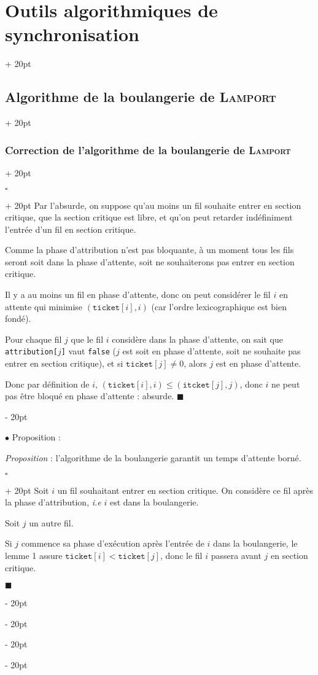\documentclass[a4paper, 12pt, twoside]{article}
\renewcommand{\le}{\leqslant}
\newcommand{\ind}[1][20pt]{\advance\leftskip + #1}
\newcommand{\deind}[1][20pt]{\advance\leftskip - #1}
\newenvironment{indt}[2][20pt]{#2 \par \ind[#1]}{\par \deind} %
\newenvironment{proof}[1][{}]{\begin{indt}{$\square$ #1}}{$\blacksquare$ \end{indt}}
\begin{document}
\begin{indt}{\section{Outils algorithmiques de synchronisation}}
\begin{indt}{\subsection{Algorithme de la boulangerie de \textsc{Lamport}}}
\begin{indt}{\subsubsection{Correction de l'algorithme de la boulangerie de \textsc{Lamport}}}
                \vspace{12pt}
                
                \begin{proof}
                    Par l'absurde, on suppose qu'au moins un fil souhaite entrer en section critique, que la section critique est libre, et qu'on peut retarder indéfiniment l'entrée d'un fil en section critique.

                    Comme la phase d'attribution n'est pas bloquante, à un moment tous les fils seront soit dans la phase d'attente, soit ne souhaiterons pas entrer en section critique.

                    Il y a au moins un fil en phase d'attente, donc on peut considérer le fil $i$ en attente qui minimise $(\mathtt{ticket}[i], i)$ (car l'ordre lexicographique est bien fondé).

                    Pour chaque fil $j$ que le fil $i$ considère dans la phase d'attente, on sait que \texttt{attribution[$j$]} vaut \texttt{false} ($j$ est soit en phase d'attente, soit ne souhaite pas entrer en section critique), et si $\mathtt{ticket}[j] \neq 0$, alors $j$ est en phase d'attente.

                    Donc par définition de $i$, $(\mathtt{ticket}[i], i) \le (\mathtt{itcket}[j], j)$, donc $i$ ne peut pas être bloqué en phase d'attente : absurde.
                \end{proof}

                \vspace{12pt}
                
                $\bullet$ Proposition :

                \begin{pseudocode}
                    \textit{Proposition} :
                    l'algorithme de la boulangerie garantit un temps d'attente borné.
                \end{pseudocode}

                \vspace{6pt}
                
                \begin{proof}
                    Soit $i$ un fil souhaitant entrer en section critique. On considère ce fil après la phase d'attribution, \textit{i.e} $i$ est dans la boulangerie.

                    Soit $j$ un autre fil.

                    Si $j$ commence sa phase d'exécution après l'entrée de $i$ dans la boulangerie, le lemme 1 assure $\mathtt{ticket}[i] < \mathtt{ticket}[j]$, donc le fil $i$ passera avant $j$ en section critique.


\end{proof}
\end{indt}
\end{indt}
\end{indt}
\end{document}
